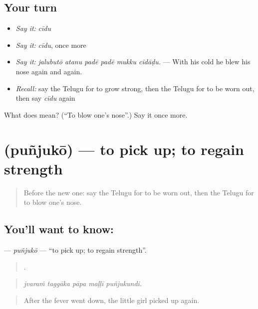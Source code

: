 \subsection*{Your turn}
\begin{itemize}
\raggedright
  \item \emph{Say it:} \emph{cīdu}
  \item \emph{Say it:} \emph{cīdu}, once more
  \item \emph{Say it:} \emph{jalubutō atanu padē padē mukku cīdāḍu.} — With his cold he blew his nose again and again.
  \item \emph{Recall:} say the Telugu for to grow strong, then the Telugu for to be worn out, then say \emph{cīdu} again
\end{itemize}

\begin{tcolorbox}[breakable,colback=teal!4,colframe=teal!35!black,title={Before you move on}]
What does  mean? (\textquotedblleft{}To blow one's nose\textquotedblright{}.) Say it once more.
\end{tcolorbox}
\section[\texorpdfstring{\te{పుంజుకో} (puñjukō)}{పుంజుకో (puñjukō)}]{ (puñjukō) — to pick up; to regain strength}

\label{lesson:TE-C520-punjuko}



\begin{quote}
Before the new one: say the Telugu for to be worn out, then the Telugu for to blow one's nose.
\end{quote}

\subsection*{You'll want to know: }
\textbf{} — \emph{puñjukō} — \textquotedblleft{}to pick up; to regain strength\textquotedblright{}.

\begin{quote}
    .
\end{quote}

\begin{quote}
\emph{jvaraṁ taggāka pāpa maḷḷī puñjukundi.}
\end{quote}

\begin{quote}
After the fever went down, the little girl picked up again.
\end{quote}

